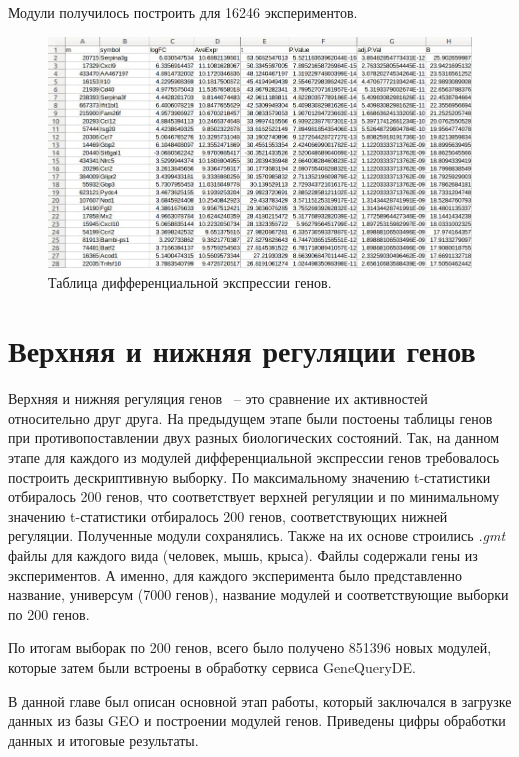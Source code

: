 \documentclass[times,specification,annotation]{itmo-student-thesis}
\begin{document}
Модули получилось построить для 16246 экспериментов.

\begin{figure}[!h]
    \caption{Таблица дифференциальной экспрессии генов.}\label{difExprs}
    \centering
    \includegraphics[width=1\textwidth]{difExprs.jpg}
\end{figure}

\section{Верхняя и нижняя регуляции генов}

Верхняя и нижняя регуляция генов ~-- это сравнение их активностей относительно друг друга. На предыдущем этапе были постоены таблицы генов при противопоставлении двух разных биологических состояний. Так, на данном этапе для каждого из модулей дифференциальной экспрессии генов требовалось построить дескриптивную выборку. По максимальному значению t-статистики отбиралось 200 генов, что соответствует верхней регуляции и по минимальному значению t-статистики отбиралось 200 генов, соответствующих нижней регуляции. Полученные модули сохранялись. Также на их основе строились \textit{.gmt} файлы для каждого вида (человек, мышь, крыса). Файлы содержали гены из экспериментов. А именно, для каждого эксперимента было представленно название, универсум (7000 генов), название модулей и соответствующие выборки по 200 генов.

По итогам выборак по 200 генов, всего было получено 851396 новых модулей, которые затем были встроены в обработку сервиса GeneQueryDE.

\chapterconclusion

В данной главе был описан основной этап работы, который заключался в загрузке данных из базы GEO и построении модулей генов. Приведены цифры обработки данных и итоговые результаты.  
\end{document}
